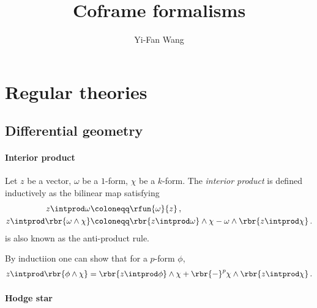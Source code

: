 \documentclass[a4paper]{article}
\title{Coframe formalisms}
\author{Yi-Fan Wang}
\begin{document}
\maketitle


\tableofcontents

\section{Regular theories}


\subsection{Differential geometry}


\paragraph{Interior product}

Let $z$ be a vector, $\omega$ be a $1$-form, $\chi$ be a $k$-form. 
The \emph{interior product} is defined inductively as the bilinear map
satisfying
\begin{align}
z \intprod \omega &\coloneqq \rfun{\omega}{z}\,, \\
z \intprod \rbr{\omega \wedge \chi} &\coloneqq
	\rbr{z\intprod\omega}\wedge \chi - \omega \wedge \rbr{z\intprod \chi}\,.
\label{eq:anti-prod-100}
\end{align}
 is also known as the anti-product rule.

By inductiion one can show that for a $p$-form $\phi$,
\begin{align}
z \intprod \rbr{\phi \wedge \chi} =
	\rbr{z\intprod\phi}\wedge \chi +
		\rbr{-}^{p} \chi \wedge \rbr{z\intprod \chi}\,.
\end{align}

\paragraph{Hodge star}
\end{document}
